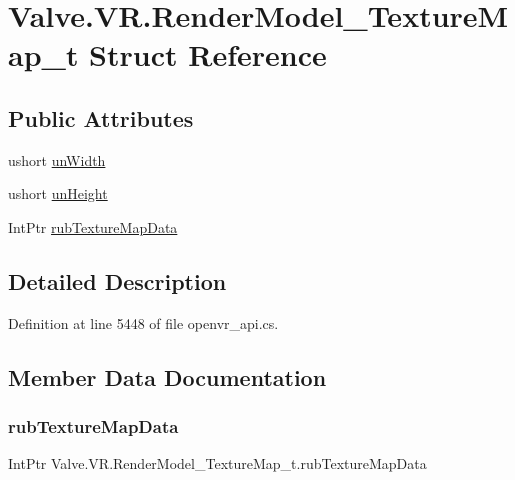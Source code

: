 \hypertarget{struct_valve_1_1_v_r_1_1_render_model___texture_map__t}{}\section{Valve.\+V\+R.\+Render\+Model\+\_\+\+Texture\+Map\+\_\+t Struct Reference}
\label{struct_valve_1_1_v_r_1_1_render_model___texture_map__t}
\subsection*{Public Attributes}
\begin{DoxyCompactItemize}
\item 
ushort \mbox{\hyperlink{struct_valve_1_1_v_r_1_1_render_model___texture_map__t_a5c41ef258b936bf72da8fdc4d1024fa7}{un\+Width}}
\item 
ushort \mbox{\hyperlink{struct_valve_1_1_v_r_1_1_render_model___texture_map__t_aa332e5d1d5260294e2f1871d494950e1}{un\+Height}}
\item 
Int\+Ptr \mbox{\hyperlink{struct_valve_1_1_v_r_1_1_render_model___texture_map__t_a009ce44777a19decfb0e720ade45ed71}{rub\+Texture\+Map\+Data}}
\end{DoxyCompactItemize}


\subsection{Detailed Description}


Definition at line 5448 of file openvr\+\_\+api.\+cs.



\subsection{Member Data Documentation}
\mbox{\label{struct_valve_1_1_v_r_1_1_render_model___texture_map__t_a009ce44777a19decfb0e720ade45ed71}} 
\subsubsection{\texorpdfstring{rubTextureMapData}{rubTextureMapData}}
{\footnotesize\ttfamily Int\+Ptr Valve.\+V\+R.\+Render\+Model\+\_\+\+Texture\+Map\+\_\+t.\+rub\+Texture\+Map\+Data}



